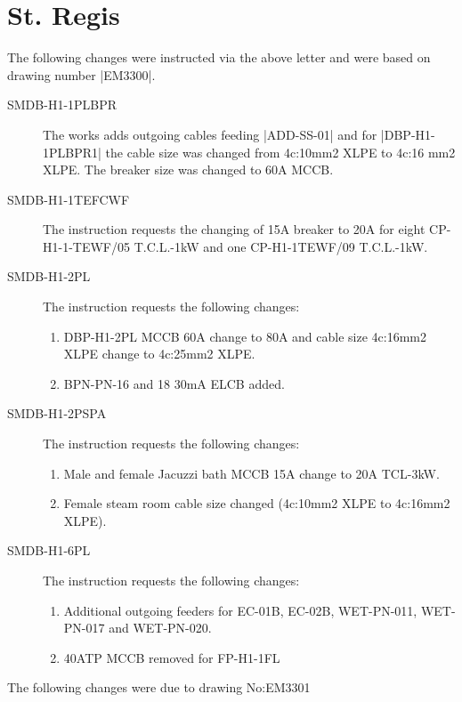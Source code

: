 \section{St. Regis}
The following changes were instructed via the above letter and were based on drawing number |EM3300|.
\begin{description}
\item[SMDB-H1-1PLBPR] The works adds outgoing cables feeding |ADD-SS-01| and for |DBP-H1-1PLBPR1|  the cable size was changed from 4c:10mm2 XLPE to 4c:16 mm2 XLPE. The breaker size was changed to 60A MCCB.

\item[SMDB-H1-1TEFCWF] The instruction requests the changing of 15A breaker to 20A for eight CP-H1-1-TEWF/05 T.C.L.-1kW and one CP-H1-1TEWF/09 T.C.L.-1kW.

\item[SMDB-H1-2PL] The instruction requests the following changes:
   \begin{enumerate}
      \item DBP-H1-2PL MCCB 60A change to 80A and cable size 4c:16mm2 XLPE change to 4c:25mm2 XLPE.
      \item BPN-PN-16 and 18 30mA ELCB added.
   \end{enumerate}

\item[SMDB-H1-2PSPA] The instruction requests the following changes:
    \begin{enumerate}
      \item Male and female Jacuzzi bath MCCB 15A change to 20A TCL-3kW.
      \item Female steam room cable size changed (4c:10mm2 XLPE to 4c:16mm2 XLPE).
    \end{enumerate}


\item[SMDB-H1-6PL] The instruction requests the following changes:
   \begin{enumerate}
      \item Additional outgoing feeders for EC-01B, EC-02B, WET-PN-011, WET-PN-017 and WET-PN-020.
      \item 40ATP MCCB removed for FP-H1-1FL
   \end{enumerate}

\end{description}

The following changes were due to drawing No:EM3301

